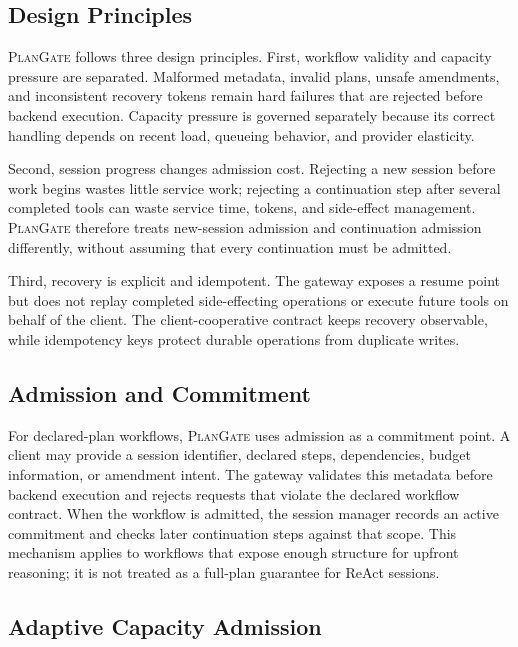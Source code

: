 \documentclass[5p,times]{elsarticle}
\newcommand{\plangate}{\textsc{PlanGate}\xspace}
\begin{document}
\subsection{Design Principles}

\plangate follows three design principles. First, workflow validity and capacity pressure are separated. Malformed metadata, invalid plans, unsafe amendments, and inconsistent recovery tokens remain hard failures that are rejected before backend execution. Capacity pressure is governed separately because its correct handling depends on recent load, queueing behavior, and provider elasticity.

Second, session progress changes admission cost. Rejecting a new session before work begins wastes little service work; rejecting a continuation step after several completed tools can waste service time, tokens, and side-effect management. \plangate therefore treats new-session admission and continuation admission differently, without assuming that every continuation must be admitted.

Third, recovery is explicit and idempotent. The gateway exposes a resume point but does not replay completed side-effecting operations or execute future tools on behalf of the client. The client-cooperative contract keeps recovery observable, while idempotency keys protect durable operations from duplicate writes.

\subsection{Admission and Commitment}

For declared-plan workflows, \plangate uses admission as a commitment point. A client may provide a session identifier, declared steps, dependencies, budget information, or amendment intent. The gateway validates this metadata before backend execution and rejects requests that violate the declared workflow contract. When the workflow is admitted, the session manager records an active commitment and checks later continuation steps against that scope. This mechanism applies to workflows that expose enough structure for upfront reasoning; it is not treated as a full-plan guarantee for ReAct sessions.

\subsection{Adaptive Capacity Admission}
\end{document}
